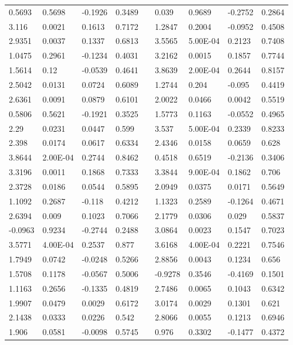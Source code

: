 \begin{table}[h!]
\begin{tabular}{lllllllll}
0.5693 & 0.5698 & -0.1926 & 0.3489 &  & 0.039 & 0.9689 & -0.2752 & 0.2864 \\
3.116 & 0.0021 & 0.1613 & 0.7172 &  & 1.2847 & 0.2004 & -0.0952 & 0.4508 \\
2.9351 & 0.0037 & 0.1337 & 0.6813 &  & 3.5565 & 5.00E-04 & 0.2123 & 0.7408 \\
1.0475 & 0.2961 & -0.1234 & 0.4031 &  & 3.2162 & 0.0015 & 0.1857 & 0.7744 \\
1.5614 & 0.12 & -0.0539 & 0.4641 &  & 3.8639 & 2.00E-04 & 0.2644 & 0.8157 \\
2.5042 & 0.0131 & 0.0724 & 0.6089 &  & 1.2744 & 0.204 & -0.095 & 0.4419 \\
2.6361 & 0.0091 & 0.0879 & 0.6101 &  & 2.0022 & 0.0466 & 0.0042 & 0.5519 \\
0.5806 & 0.5621 & -0.1921 & 0.3525 &  & 1.5773 & 0.1163 & -0.0552 & 0.4965 \\
2.29 & 0.0231 & 0.0447 & 0.599 &  & 3.537 & 5.00E-04 & 0.2339 & 0.8233 \\
2.398 & 0.0174 & 0.0617 & 0.6334 &  & 2.4346 & 0.0158 & 0.0659 & 0.628 \\
3.8644 & 2.00E-04 & 0.2744 & 0.8462 &  & 0.4518 & 0.6519 & -0.2136 & 0.3406 \\
3.3196 & 0.0011 & 0.1868 & 0.7333 &  & 3.3844 & 9.00E-04 & 0.1862 & 0.706 \\
2.3728 & 0.0186 & 0.0544 & 0.5895 &  & 2.0949 & 0.0375 & 0.0171 & 0.5649 \\
1.1092 & 0.2687 & -0.118 & 0.4212 &  & 1.1323 & 0.2589 & -0.1264 & 0.4671 \\
2.6394 & 0.009 & 0.1023 & 0.7066 &  & 2.1779 & 0.0306 & 0.029 & 0.5837 \\
-0.0963 & 0.9234 & -0.2744 & 0.2488 &  & 3.0864 & 0.0023 & 0.1547 & 0.7023 \\
3.5771 & 4.00E-04 & 0.2537 & 0.877 &  & 3.6168 & 4.00E-04 & 0.2221 & 0.7546 \\
1.7949 & 0.0742 & -0.0248 & 0.5266 &  & 2.8856 & 0.0043 & 0.1234 & 0.656 \\
1.5708 & 0.1178 & -0.0567 & 0.5006 &  & -0.9278 & 0.3546 & -0.4169 & 0.1501 \\
1.1163 & 0.2656 & -0.1335 & 0.4819 &  & 2.7486 & 0.0065 & 0.1043 & 0.6342 \\
1.9907 & 0.0479 & 0.0029 & 0.6172 &  & 3.0174 & 0.0029 & 0.1301 & 0.621 \\
2.1438 & 0.0333 & 0.0226 & 0.542 &  & 2.8066 & 0.0055 & 0.1213 & 0.6946 \\
1.906 & 0.0581 & -0.0098 & 0.5745 &  & 0.976 & 0.3302 & -0.1477 & 0.4372 \\

\end{tabular}
\end{table}

